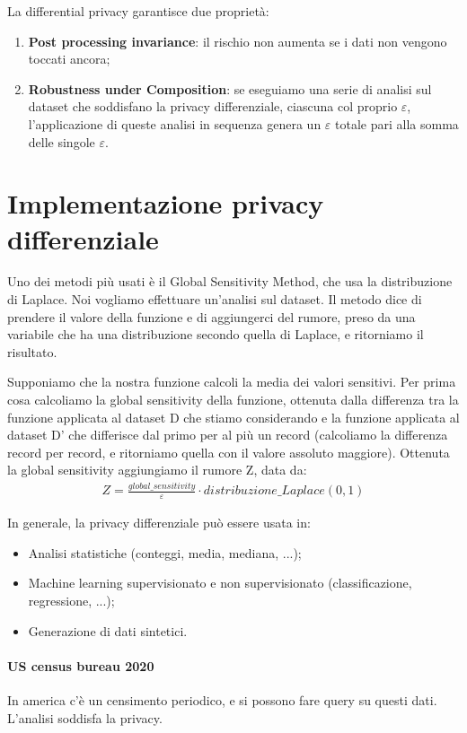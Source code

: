 \noindent La differential privacy garantisce due proprietà:
\begin{enumerate}
    \item \textbf{Post processing invariance}: il rischio non aumenta se i dati non vengono toccati ancora;
    \item \textbf{Robustness under Composition}: se eseguiamo una serie di analisi sul dataset che soddisfano la privacy differenziale, ciascuna col proprio $\varepsilon$, l'applicazione di queste analisi in sequenza genera un $\varepsilon$ totale pari alla somma delle singole $\varepsilon$.
\end{enumerate}

\section{Implementazione privacy differenziale}
Uno dei metodi più usati è il Global Sensitivity Method, che usa la distribuzione di Laplace. Noi vogliamo effettuare un'analisi sul dataset. Il metodo dice di prendere il valore della funzione e di aggiungerci del rumore, preso da una variabile che ha una distribuzione secondo quella di Laplace, e ritorniamo il risultato.

Supponiamo che la nostra funzione calcoli la media dei valori sensitivi. Per prima cosa calcoliamo la global sensitivity della funzione, ottenuta dalla differenza tra la funzione applicata al dataset D che stiamo considerando e la funzione applicata al dataset D' che differisce dal primo per al più un record (calcoliamo la differenza record per record, e ritorniamo quella con il valore assoluto maggiore). Ottenuta la global sensitivity aggiungiamo il rumore Z, data da:
\begin{align*}
    Z = \frac{global\_sensitivity}{\varepsilon} \cdot distribuzione\_Laplace(0, 1)
\end{align*}

\noindent In generale, la privacy differenziale può essere usata in:
\begin{itemize}
    \item Analisi statistiche (conteggi, media, mediana, ...);
    \item Machine learning supervisionato e non supervisionato (classificazione, regressione, ...);
    \item Generazione di dati sintetici.
\end{itemize}

\paragraph{US census bureau 2020} In america c’è un censimento periodico, e si possono fare query su questi dati. L’analisi soddisfa la privacy.
